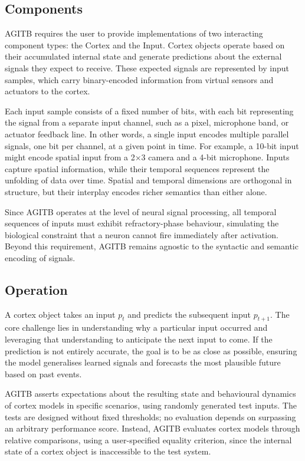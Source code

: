 \documentclass{article}
\begin{document}
\subsection{Components}
AGITB requires the user to provide implementations of two interacting component types: the Cortex and the Input. Cortex objects operate based on their accumulated internal state and generate predictions about the external signals they expect to receive. These expected signals are represented by input samples, which carry binary-encoded information from virtual sensors and actuators to the cortex.

Each input sample consists of a fixed number of bits, with each bit representing the signal from a separate input channel, such as a pixel, microphone band, or actuator feedback line. In other words, a single input encodes multiple parallel signals, one bit per channel, at a given point in time. For example, a 10-bit input might encode spatial input from a 2×3 camera and a 4-bit microphone. Inputs capture spatial information, while their temporal sequences represent the unfolding of data over time. Spatial and temporal dimensions are orthogonal in structure, but their interplay encodes richer semantics than either alone. 

Since AGITB operates at the level of neural signal processing, all temporal sequences of inputs must exhibit refractory-phase behaviour, simulating the biological constraint that a neuron cannot fire immediately after activation. Beyond this requirement, AGITB remains agnostic to the syntactic and semantic encoding of signals. 

\subsection{Operation}

A cortex object takes an input $p_t$ and predicts the subsequent input $p_{t+1}$. The core challenge lies in understanding why a particular input occurred and leveraging that understanding to anticipate the next input to come. If the prediction is not entirely accurate, the goal is to be as close as possible, ensuring the model generalises learned signals and forecasts the most plausible future based on past events.

AGITB asserts expectations about the resulting state and behavioural dynamics of cortex models in specific scenarios, using randomly generated test inputs. The tests are designed without fixed thresholds; no evaluation depends on surpassing an arbitrary performance score. Instead, AGITB evaluates cortex models through relative comparisons, using a user-specified equality criterion, since the internal state of a cortex object is inaccessible to the test system.
\end{document}
